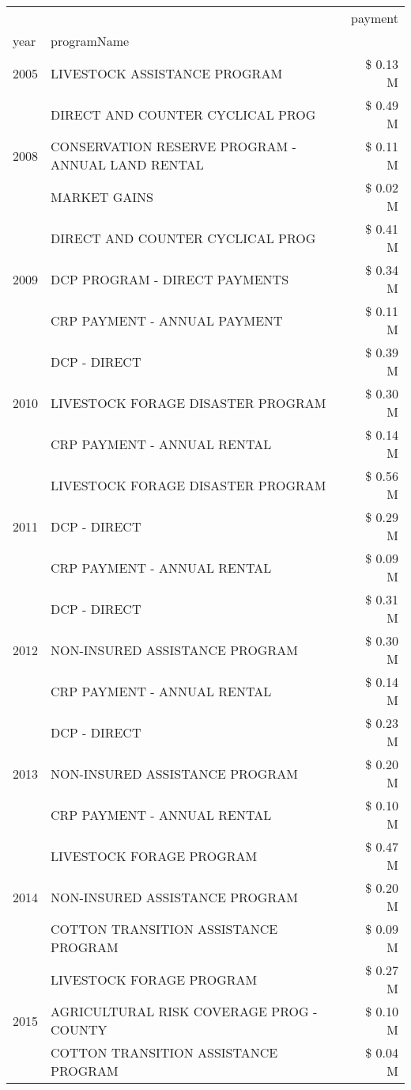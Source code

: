 \begin{tabular}{llr}
\toprule
 &  & payment \\
year & programName &  \\
\midrule
2005 & LIVESTOCK ASSISTANCE PROGRAM & \$ 0.13 M \\
\cline{1-3}
\multirow[t]{3}{*}{2008} & DIRECT AND COUNTER CYCLICAL PROG & \$ 0.49 M \\
 & CONSERVATION RESERVE PROGRAM - ANNUAL LAND RENTAL & \$ 0.11 M \\
 & MARKET GAINS & \$ 0.02 M \\
\cline{1-3}
\multirow[t]{3}{*}{2009} & DIRECT AND COUNTER CYCLICAL PROG & \$ 0.41 M \\
 & DCP PROGRAM - DIRECT PAYMENTS & \$ 0.34 M \\
 & CRP PAYMENT - ANNUAL PAYMENT & \$ 0.11 M \\
\cline{1-3}
\multirow[t]{3}{*}{2010} & DCP - DIRECT & \$ 0.39 M \\
 & LIVESTOCK FORAGE DISASTER PROGRAM & \$ 0.30 M \\
 & CRP PAYMENT - ANNUAL RENTAL & \$ 0.14 M \\
\cline{1-3}
\multirow[t]{3}{*}{2011} & LIVESTOCK FORAGE DISASTER PROGRAM & \$ 0.56 M \\
 & DCP - DIRECT & \$ 0.29 M \\
 & CRP PAYMENT - ANNUAL RENTAL & \$ 0.09 M \\
\cline{1-3}
\multirow[t]{3}{*}{2012} & DCP - DIRECT & \$ 0.31 M \\
 & NON-INSURED ASSISTANCE PROGRAM & \$ 0.30 M \\
 & CRP PAYMENT - ANNUAL RENTAL & \$ 0.14 M \\
\cline{1-3}
\multirow[t]{3}{*}{2013} & DCP - DIRECT & \$ 0.23 M \\
 & NON-INSURED ASSISTANCE PROGRAM & \$ 0.20 M \\
 & CRP PAYMENT - ANNUAL RENTAL & \$ 0.10 M \\
\cline{1-3}
\multirow[t]{3}{*}{2014} & LIVESTOCK FORAGE PROGRAM & \$ 0.47 M \\
 & NON-INSURED ASSISTANCE PROGRAM & \$ 0.20 M \\
 & COTTON TRANSITION ASSISTANCE PROGRAM & \$ 0.09 M \\
\cline{1-3}
\multirow[t]{3}{*}{2015} & LIVESTOCK FORAGE PROGRAM & \$ 0.27 M \\
 & AGRICULTURAL RISK COVERAGE PROG - COUNTY & \$ 0.10 M \\
 & COTTON TRANSITION ASSISTANCE PROGRAM & \$ 0.04 M \\

\end{tabular}
